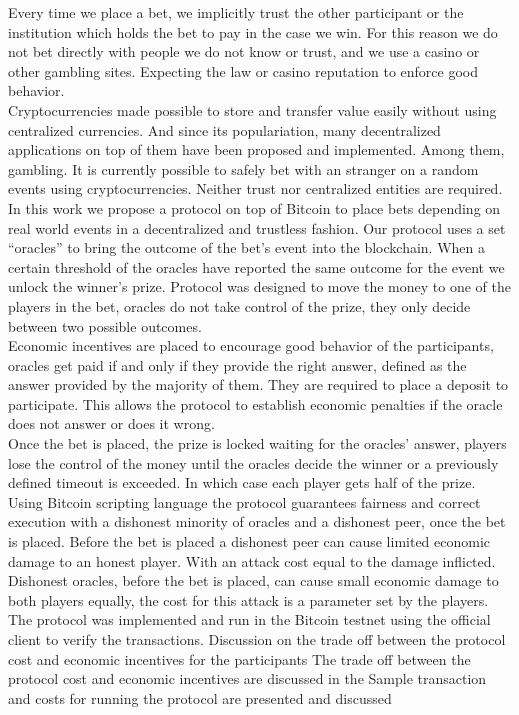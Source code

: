 Every time we place a bet, we implicitly trust the other participant or the
  institution which holds the bet to pay in the case we win.
For this reason we do not bet directly with people we do not know or trust,
  and we use a casino or other gambling sites.
Expecting the law or casino reputation to enforce good behavior.\\
\noindent
Cryptocurrencies made possible to store and transfer value easily without
  using centralized currencies.
And since its populariation, many decentralized applications on top of them
  have been proposed and implemented.
Among them, gambling.
It is currently possible to safely bet with an stranger on a random events
  using cryptocurrencies.
Neither trust nor centralized entities are required.
In this work we propose a protocol on top of Bitcoin to place bets depending on
  real world events in a decentralized and trustless fashion.
\noindent
Our protocol uses a set ``oracles'' to bring the outcome of the bet's event into
  the blockchain.
When a certain threshold of the oracles have reported the same outcome for
  the event we unlock the winner's prize.
Protocol was designed to move the money to one of the players in the bet,
  oracles do not take control of the prize, they only decide between two
  possible outcomes.\\
\noindent
Economic incentives are placed to encourage good behavior of the participants,
  oracles get paid if and only if they provide the right answer, defined as the
  answer provided by the majority of them.
They are required to place a deposit to participate.
This allows the protocol to establish economic penalties if the oracle does not
  answer or does it wrong.\\
\noindent
Once the bet is placed, the prize is locked waiting for the oracles' answer,
  players lose the control of the money until the oracles decide the winner
  or a previously defined timeout is exceeded.
In which case each player gets half of the prize.\\
\noindent
Using Bitcoin scripting language the protocol guarantees fairness and correct
  execution with a dishonest minority of oracles and a dishonest peer, once the
  bet is placed.
Before the bet is placed a dishonest peer can cause limited economic damage to
  an honest player.
With an attack cost equal to the damage inflicted.
Dishonest oracles, before the bet is placed, can cause small economic damage to
  both players equally, the cost for this attack is a parameter set by the
  players.\\
\noindent
The protocol was implemented and run in the Bitcoin testnet using the official
  client to verify the transactions.
Discussion on the trade off between the protocol cost and economic incentives
  for the participants
  The trade off between the protocol cost and economic incentives are discussed
  in the
Sample transaction and costs for running the protocol are presented and
  discussed

